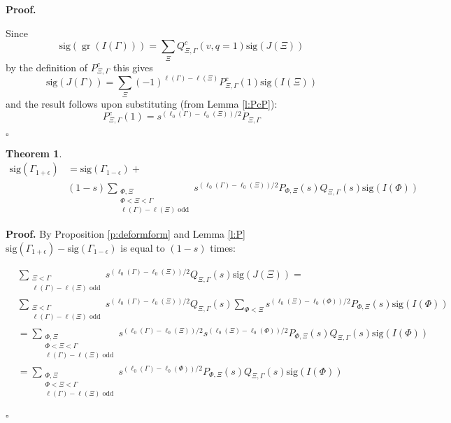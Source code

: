 \documentclass[12pt,leqno]{article}
\newtheorem{theorem}[equation]{Theorem}
\newcommand{\qed}{\hfill $\square$ \medskip}
\newenvironment{proof}[1][Proof]{\noindent\textbf{#1.} }{\qed}
\newcommand{\sig}{\text{sig}}
\DeclareMathOperator{\gr}{\text{gr}}
\begin{document}
\begin{proof}


Since
$$
\sig(\gr(I(\Gamma)))=\sum_\Xi Q^c_{\Xi,\Gamma}(v,q=1) \sig(J(\Xi))
$$
by the definition of $P^c_{\Xi,\Gamma}$ this gives
$$
\sig(J(\Gamma))=\sum_\Xi (-1)^{\ell(\Gamma)-\ell(\Xi)}P^c_{\Xi,\Gamma}(1)\sig(I(\Xi))
$$
and the result follows upon substituting (from Lemma \ref{l:PcP}):
$$
P^c_{\Xi,\Gamma}(1)=s^{(\ell_0(\Gamma)-\ell_0(\Xi))/2}P_{\Xi,\Gamma}
$$

\end{proof}




\begin{theorem}
\normalfont
$$
\begin{aligned}
\sig(\Gamma_{1+\epsilon})&=\sig(\Gamma_{1-\epsilon})+\\
&(1-s)\sum_{\substack{\Phi,\Xi\\\Phi<\Xi<\Gamma\\\ell(\Gamma)-\ell(\Xi)\text{ odd}}} s^{(\ell_0(\Gamma)-\ell_0(\Xi))/2}P_{\Phi,\Xi}(s)Q_{\Xi,\Gamma}(s)
\sig(I(\Phi))
\end{aligned}
$$
\end{theorem}

\begin{proof}
By Proposition \ref{p:deformform}  and Lemma \ref{l:P}
$\sig(\Gamma_{1+\epsilon})-\sig(\Gamma_{1-\epsilon})$  is equal to $(1-s)$ times:

$$
\begin{aligned}
&\sum_{\substack{\Xi<\Gamma\\\ell(\Gamma)-\ell(\Xi)\text{ odd}}} s^{(\ell_0(\Gamma)-\ell_0(\Xi))/2}Q_{\Xi,\Gamma}(s)\sig(J(\Xi))=\\
&\sum_{\substack{\Xi<\Gamma\\\ell(\Gamma)-\ell(\Xi)\text{ odd}}} s^{(\ell_0(\Gamma)-\ell_0(\Xi))/2}Q_{\Xi,\Gamma}(s)
\sum_{\Phi<\Xi}s^{(\ell_0(\Xi)-\ell_0(\Phi))/2}P_{\Phi,\Xi}(s)\sig(I(\Phi))\\
&=\sum_{\substack{\Phi,\Xi\\\Phi<\Xi<\Gamma\\\ell(\Gamma)-\ell(\Xi)\text{ odd}}}
s^{(\ell_0(\Gamma)-\ell_0(\Xi))/2}
s^{(\ell_0(\Xi)-\ell_0(\Phi))/2}P_{\Phi,\Xi}(s)Q_{\Xi,\Gamma}(s)\sig(I(\Phi))\\
&=
\sum_{\substack{\Phi,\Xi\\\Phi<\Xi<\Gamma\\\ell(\Gamma)-\ell(\Xi)\text{ odd}}}
s^{(\ell_0(\Gamma)-\ell_0(\Phi))/2}
P_{\Phi,\Xi}(s)Q_{\Xi,\Gamma}(s)\sig(I(\Phi))\\
\end{aligned}
$$

\end{proof}
\end{document}
